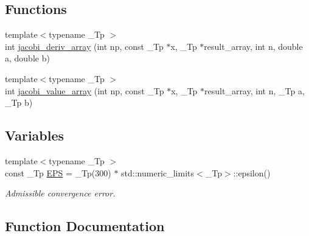 \subsection*{Functions}
\begin{DoxyCompactItemize}
\item 
{\footnotesize template$<$typename \+\_\+\+Tp $>$ }\\int \hyperlink{gauss__jacobi__integrate_8tcc_aa3c283237c0f0fa73fbd1bc2f867ead2}{jacobi\+\_\+deriv\+\_\+array} (int np, const \+\_\+\+Tp $\ast$x, \+\_\+\+Tp $\ast$result\+\_\+array, int n, double a, double b)
\item 
{\footnotesize template$<$typename \+\_\+\+Tp $>$ }\\int \hyperlink{gauss__jacobi__integrate_8tcc_a17622e4f72acae1977c8ab8deb58e77f}{jacobi\+\_\+value\+\_\+array} (int np, const \+\_\+\+Tp $\ast$x, \+\_\+\+Tp $\ast$result\+\_\+array, int n, \+\_\+\+Tp a, \+\_\+\+Tp b)
\end{DoxyCompactItemize}
\subsection*{Variables}
\begin{DoxyCompactItemize}
\item 
{\footnotesize template$<$typename \+\_\+\+Tp $>$ }\\const \+\_\+\+Tp \hyperlink{gauss__jacobi__integrate_8tcc_a4588eefde4c686e65f5f208a3ae06f1f}{E\+PS} = \+\_\+\+Tp(300) $\ast$ std\+::numeric\+\_\+limits$<$\+\_\+\+Tp$>$\+::epsilon()
\begin{DoxyCompactList}\small\item\em Admissible convergence error. \end{DoxyCompactList}\end{DoxyCompactItemize}


\subsection{Function Documentation}
\mbox{\label{gauss__jacobi__integrate_8tcc_aa3c283237c0f0fa73fbd1bc2f867ead2}} 
